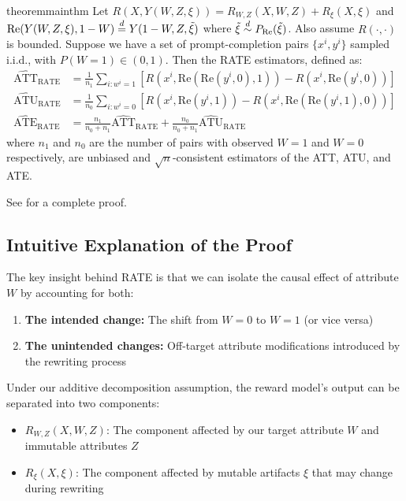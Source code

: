 \begin{restatable}{theorem}{mainthm}
\label{thm:mainthm}
Let $R(X, Y(W,Z,\xi)) = R_{W, Z}(X, W, Z) + R_{\xi}(X, \xi)$ and $\text{Re}(Y(W, Z, \xi), 1 - W) \stackrel{d}{=} Y(1 - W, Z, \tilde{\xi})$ where $\tilde{\xi} \stackrel{d}{\sim} P_\text{Re}(\tilde{\xi})$. Also assume $R(\cdot, \cdot)$ is bounded. Suppose we have a set of prompt-completion pairs $\{x^i, y^{i}\}$ sampled i.i.d., with $P(W=1) \in (0, 1)$.
  Then the RATE estimators, defined as:
  \begin{align*}
  \widehat{\text{ATT}}_{\text{RATE}} &= \frac{1}{n_1} \sum_{i: w^{i} = 1} [R(x^i, \text{Re}(\text{Re}(y^{i}, 0), 1)) - R(x^i, \text{Re}(y^{i}, 0))] \\
  \widehat{\text{ATU}}_{\text{RATE}} &= \frac{1}{n_0} \sum_{i: w^{i} = 0} [R(x^i, \text{Re}(y^{i}, 1)) - R(x^i, \text{Re}(\text{Re}(y^{i}, 1), 0))] \\
  \widehat{\text{ATE}}_{\text{RATE}} &= \frac{n_1}{n_0 + n_1} \widehat{\text{ATT}}_{\text{RATE}} + \frac{n_0}{n_0 + n_1} \widehat{\text{ATU}}_{\text{RATE}}
\end{align*}
where $n_1$ and $n_0$ are the number of pairs with observed $W = 1$ and $W = 0$ respectively, are unbiased and $\sqrt{n}$-consistent estimators of the ATT, ATU, and ATE.
\end{restatable}

\noindent See  for a complete proof.

\subsection{Intuitive Explanation of the Proof}
The key insight behind RATE is that we can isolate the causal effect of attribute $W$ by accounting for both:

\begin{enumerate}
    \item \textbf{The intended change:} The shift from $W=0$ to $W=1$ (or vice versa)
    \item \textbf{The unintended changes:} Off-target attribute modifications introduced by the rewriting process
\end{enumerate}

Under our additive decomposition assumption, the reward model's output can be separated into two components:

\begin{itemize}
    \item $R_{W,Z}(X,W,Z)$: The component affected by our target attribute $W$ and immutable attributes $Z$
    \item $R_{\xi}(X,\xi)$: The component affected by mutable artifacts $\xi$ that may change during rewriting
\end{itemize}

